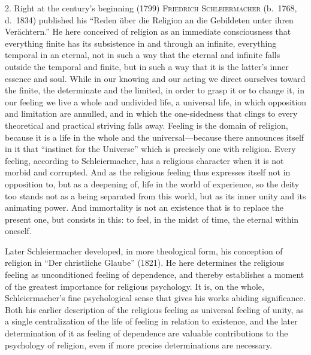 \documentclass[12pt,a4paper]{book}
\newcommand{\opage}[1]{\marginnote{\footnotesize\textit{[#1]}}}
\begin{document}
2. Right at the century's beginning (1799) \textsc{Friedrich
Schleiermacher} (b.\ 1768, d.\ 1834) published his ``Reden über die
Religion an die Gebildeten unter ihren Verächtern.'' He here conceived of
religion as an immediate consciousness that everything finite has its
subsistence in and through an infinite, everything temporal in an
eternal, not in such a way that the eternal and infinite falls outside
the temporal and finite, but in such a way that it is the latter's inner
essence and soul. While in our knowing and our acting we direct
ourselves toward the finite, the determinate and the limited, in order to
grasp it or to change it, in our feeling we live a whole and undivided
life, a universal life, in which opposition and limitation are annulled,
and in which the one-sidedness that clings to every theoretical and
practical striving falls away. Feeling is the domain of religion,
because it is a life in the whole and the universal---because there
announces itself in it that ``instinct for the Universe'' which is
precisely one with religion. Every feeling, according to Schleiermacher,
has a religious character when it is not morbid and corrupted. And as the
religious feeling thus expresses itself not in opposition to, but as a
deepening of, life in the world of experience, so the deity too stands
not as a being separated from this world, but as its inner unity and its
animating power. And immortality is not an existence that is to replace
the present one, but consists in this: to feel, in the midst of time, the
eternal within oneself.

\opage{7}Later Schleiermacher developed, in more theological form, his conception
of religion in ``Der christliche Glaube'' (1821). He here determines the
religious feeling as unconditioned feeling of dependence, and thereby
establishes a moment of the greatest importance for religious psychology.
It is, on the whole, Schleiermacher's fine psychological sense that gives
his works abiding significance. Both his earlier description of the
religious feeling as universal feeling of unity, as a single centralization
of the life of feeling in relation to existence, and the later
determination of it as feeling of dependence are valuable contributions to
the psychology of religion, even if more precise determinations are
necessary.
\end{document}
